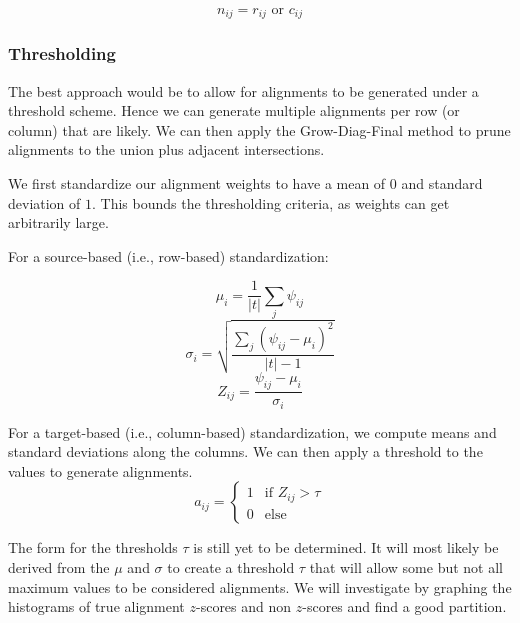 \documentclass[twoside,twocolumn]{article}
\begin{document}
\begin{equation}
  n_{ij} = r_{ij} \text{ or } c_{ij}
\end{equation}


\subsubsection{Thresholding}

The best approach would be to allow for alignments to be generated under a
threshold scheme. Hence we can generate multiple alignments per row (or column)
that are likely. We can then apply the Grow-Diag-Final method to prune
alignments to the union plus adjacent intersections.

We first standardize our alignment weights to have a mean of $0$ and standard
deviation of $1$. This bounds the thresholding criteria, as weights can get
arbitrarily large.

For a source-based (i.e., row-based) standardization:

\begin{equation}
  \mu_{i} = \frac{1}{|t|} \sum_j \psi_{ij}
\end{equation}
\begin{equation}
  \sigma_{i} = \sqrt{\frac{\sum_j \left( \psi_{ij} - \mu_i \right)^2}{|t|-1}}
\end{equation}
\begin{equation}
  Z_{ij} = \frac{\psi_{ij} - \mu_i}{\sigma_i}
\end{equation}

For a target-based (i.e., column-based) standardization, we compute means and
standard deviations along the columns. We can then apply a threshold to the
values to generate alignments.
\begin{equation}
  a_{ij} = \begin{cases}
    1 & \text{if } Z_{ij} > \tau \\
    0 & \text{else}
  \end{cases}
\end{equation}

The form for the thresholds $\tau$ is still yet to be determined. It will most
likely be derived from the $\mu$ and $\sigma$ to create a threshold $\tau$ that
will allow some but not all maximum values to be considered alignments. We will
investigate by graphing the histograms of true alignment $z$-scores and non
$z$-scores and find a good partition.
\end{document}
